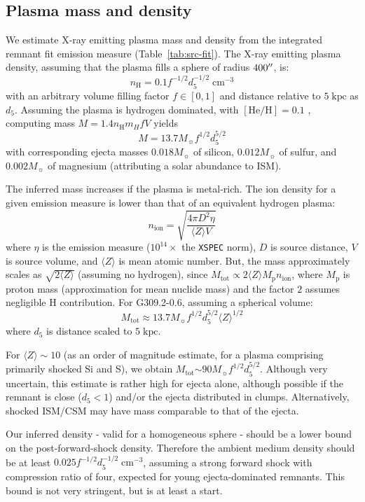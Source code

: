 \documentclass[preprint2,tighten,trackchanges]{aastex6}
\newcommand*{\mt}{\mathrm}
\newcommand*{\unit}[1]{\;\mt{#1}}  %
\newcommand*{\abt}{\mathord{\sim}} %
\begin{document}
\subsection{Plasma mass and density}

We estimate X-ray emitting plasma mass and density from the integrated remnant
fit emission measure (Table~\ref{tab:src-fit}).
The X-ray emitting plasma density, assuming that the plasma fills a sphere of
radius $400\mbox{$^{\prime\prime}$}$, is:
\[
    n_{\mt{H}} = 0.1 f^{-1/2} d_{5}^{-1/2} \unit{cm^{-3}}
\]
with an arbitrary volume filling factor $f \in [0,1]$ and distance relative to
$5 \unit{kpc}$ as $d_{5}$.
Assuming the plasma is hydrogen dominated, with $[\mt{He}/\mt{H}] = 0.1$
\citep{wilms2000}, computing mass $M = 1.4 n_{\mt{H}} m_{H} f V$ yields
\[
    M = 13.7 M_{\sun} f^{1/2} d_{5}^{5/2}
\]
with corresponding ejecta masses $0.018 M_{\sun}$ of silicon, $0.012 M_{\sun}$
of sulfur, and $0.002 M_{\sun}$ of magnesium (attributing a solar abundance to
ISM).

The inferred mass increases if the plasma is metal-rich.
The ion density for a given emission measure is lower than that of an
equivalent hydrogen plasma:
\[
    n_{\mt{ion}} = \sqrt{\frac{4 \pi D^2 \eta}{\langle Z \rangle V}}
\]
where $\eta$ is the emission measure ($10^{14}\times$ the \texttt{XSPEC} norm),
$D$ is source distance, $V$ is source volume, and $\langle Z \rangle$ is mean
atomic number.
But, the mass approximately scales as $\sqrt{2 \langle Z \rangle}$ (assuming no
hydrogen), since
$M_{\mt{tot}} \propto 2 \langle Z \rangle M_{\mt{p}} n_{\mt{ion}}$,
where $M_{\mt{p}}$ is proton mass (approximation for mean nuclide mass) and the
factor $2$ assumes negligible H contribution.
For G309.2-0.6, assuming a spherical volume:
\[
    M_{\mt{tot}} \approx 13.7 M_{\sun} f^{1/2} d_5^{5/2} \langle Z \rangle^{1/2}
\]
where $d_5$ is distance scaled to $5 \unit{kpc}$.

For $\langle Z \rangle \sim 10$ (as an order of magnitude estimate, for a
plasma comprising primarily shocked Si and S), we obtain
$M_{\mt{tot}} \abt 90 M_{\sun} f^{1/2} d_5^{5/2}$.
Although very uncertain, this estimate is rather high for ejecta alone,
although possible if the remnant is close ($d_5 < 1$) and/or the ejecta
distributed in clumps.
Alternatively, shocked ISM/CSM may have mass comparable to that of the ejecta.

Our inferred density - valid for a homogeneous sphere - should be a lower bound
on the post-forward-shock density.
Therefore the ambient medium density should be at least
$0.025 f^{-1/2} d_{5}^{-1/2} \unit{cm^{-3}}$, assuming a strong forward shock
with compression ratio of four, expected for young ejecta-dominated remnants.
This bound is not very stringent, but is at least a start.
\end{document}
